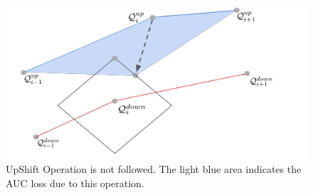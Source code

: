 \documentclass{article}
\newcommand{\ourdef}{-Equalized ROC}
\begin{document}

\begin{figure}[!h]
    \centering
    \includegraphics[scale =0.1]{diagrams/UpShift_proof_NOT.jpg}
    \caption{UpShift Operation is not followed. The light blue area indicates the AUC loss due to this operation.}
    \label{fig:nUpSh}
\end{figure}
\end{document}
